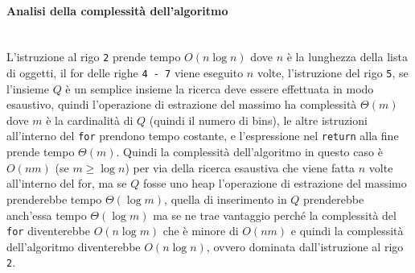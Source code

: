 \paragraph{Analisi della complessità dell'algoritmo}\mbox{}\\
L'istruzione al rigo \texttt{2} prende tempo $ O(n \log{}n) $ dove $ n $ è la lunghezza della lista di oggetti, il for delle righe \texttt{4 - 7} viene eseguito $ n $
volte, l'istruzione del rigo \texttt{5}, se l'insieme $ Q $ è un semplice insieme la ricerca deve essere effettuata in modo esaustivo, quindi l'operazione di estrazione del 
massimo ha complessità $ \Theta(m) $ dove $ m $ è la cardinalità di $ Q $ (quindi il numero di bins), le altre istruzioni all'interno del \texttt{for} prendono tempo costante, e 
l'espressione nel \texttt{return} alla fine prende tempo $ \Theta(m) $. Quindi la complessità dell'algoritmo in questo caso è $ O(nm) $ (se $ m \geq \log{}n $) per via della 
ricerca esaustiva che viene fatta $ n $ volte all'interno del for, ma se $ Q $ fosse uno heap l'operazione di estrazione del massimo prenderebbe tempo $ \Theta(\log{}m) $, 
quella di inserimento in $ Q $ prenderebbe anch'essa tempo $ \Theta(\log{}m) $ ma se ne trae vantaggio perché la complessità del \texttt{for} diventerebbe $ O(n \log{}m) $ che è minore di $ O(nm) $
e quindi la complessità dell'algoritmo diventerebbe $ O(n \log{}n) $, ovvero dominata dall'istruzione al rigo \texttt{2}.

